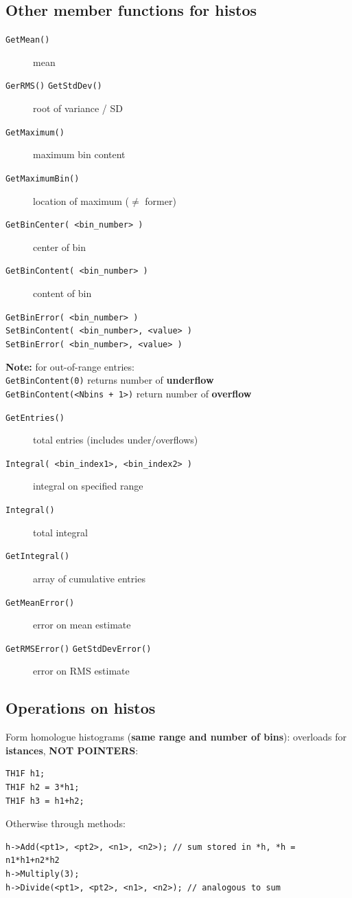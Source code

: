 \documentclass[10pt, oneside]{article}
\begin{document}
\subsection{Other member functions for histos}
\begin{description}
\item[\texttt{GetMean()}] mean
\item[\texttt{GerRMS()} \texttt{GetStdDev()}]root of variance / SD
\item[\texttt{GetMaximum()}] maximum bin content
\item[\texttt{GetMaximumBin()}] location of maximum ($\neq$ former)
\item[\texttt{GetBinCenter( <bin\_number> )}] center of bin
\item[\texttt{GetBinContent( <bin\_number> )}] content of bin
\item[\texttt{GetBinError( <bin\_number> )}]
\item[\texttt{SetBinContent( <bin\_number>, <value> )}]
\item[\texttt{SetBinError( <bin\_number>, <value> )}]
\end{description}
\textbf{Note:} for out-of-range entries:
\\\texttt{GetBinContent(0)} returns number of \textbf{underflow}
\\\texttt{GetBinContent(<Nbins + 1>)} return number of \textbf{overflow}
\begin{description}
\item[\texttt{GetEntries()}] total entries (includes under/overflows)
\item[\texttt{Integral( <bin\_index1>, <bin\_index2> )}] integral on specified range
\item[\texttt{Integral()}] total integral
\item[\texttt{GetIntegral()}] array of cumulative entries
\item[\texttt{GetMeanError()}] error on mean estimate
\item[\texttt{GetRMSError()} \texttt{GetStdDevError()}] error on RMS estimate
\end{description}

\subsection{Operations on histos}
Form homologue histograms (\textbf{same range and number of bins}): overloads for \textbf{istances}, \textbf{NOT POINTERS}:
\begin{verbatim}
TH1F h1;
TH1F h2 = 3*h1;
TH1F h3 = h1+h2;
\end{verbatim}
Otherwise through methods:
\begin{verbatim}
h->Add(<pt1>, <pt2>, <n1>, <n2>); // sum stored in *h, *h = n1*h1+n2*h2
h->Multiply(3);
h->Divide(<pt1>, <pt2>, <n1>, <n2>); // analogous to sum
\end{verbatim}
\end{document}
